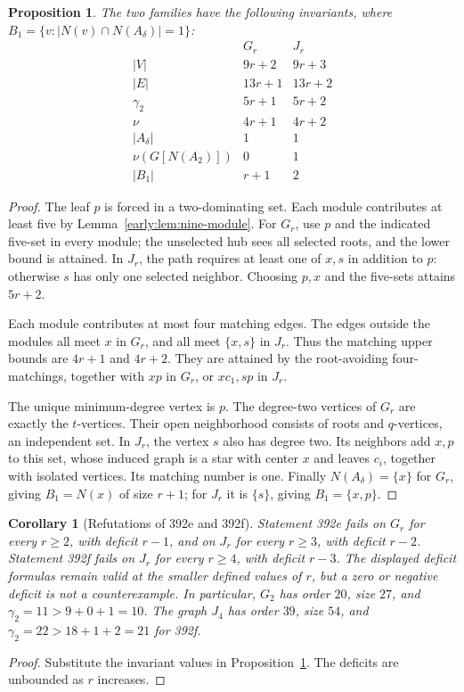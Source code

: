 \documentclass[11pt,a4paper]{article}
\newtheorem{proposition}[theorem]{Proposition}
\newtheorem{corollary}[theorem]{Corollary}
\theoremstyle{definition}\newtheorem{definition}[theorem]{Definition}
\theoremstyle{remark}\newtheorem{remark}[theorem]{Remark}
\begin{document}
\begin{proposition}
\label{early:prop:392-table}
The two families have the following invariants, where
$B_1=\{v:|N(v)\cap N(A_\delta)|=1\}$:
\[
\begin{array}{c|cc}
 &G_r&J_r\\\hline
 |V|&9r+2&9r+3\\
 |E|&13r+1&13r+2\\
 \gamma_2&5r+1&5r+2\\
 \nu&4r+1&4r+2\\
 |A_\delta|&1&1\\
 \nu(G[N(A_2)])&0&1\\
 |B_1|&r+1&2
\end{array}
\]
\end{proposition}
\begin{proof}
The leaf $p$ is forced in a two-dominating set.  Each module contributes
at least five by Lemma~\ref{early:lem:nine-module}.  For $G_r$, use $p$
and the indicated five-set in every module; the unselected hub sees all
selected roots, and the lower bound is attained.  In $J_r$, the path
requires at least one of $x,s$ in addition to $p$: otherwise $s$ has
only one selected neighbor.  Choosing $p,x$ and the five-sets attains
$5r+2$.

Each module contributes at most four matching edges.  The edges outside
the modules all meet $x$ in $G_r$, and all meet $\{x,s\}$ in $J_r$.
Thus the matching upper bounds are $4r+1$ and $4r+2$.  They are
attained by the root-avoiding four-matchings, together with $xp$ in
$G_r$, or $xc_1,sp$ in $J_r$.

The unique minimum-degree vertex is $p$.  The degree-two vertices of
$G_r$ are exactly the $t$-vertices.  Their open neighborhood consists
of roots and $q$-vertices, an independent set.  In $J_r$, the vertex
$s$ also has degree two.  Its neighbors add $x,p$ to this set, whose
induced graph is a star with center $x$ and leaves $c_i$, together
with isolated vertices.  Its matching number is one.  Finally
$N(A_\delta)=\{x\}$ for $G_r$, giving $B_1=N(x)$ of size $r+1$;
for $J_r$ it is $\{s\}$, giving $B_1=\{x,p\}$.
\end{proof}

\begin{corollary}[Refutations of 392e and 392f]
\label{early:cor:392ef}
Statement 392e fails on $G_r$ for every $r\geq2$, with deficit $r-1$,
and on $J_r$ for every $r\geq3$, with deficit $r-2$.
Statement 392f fails on $J_r$ for every $r\geq4$, with deficit $r-3$.
The displayed deficit formulas remain valid at the smaller defined values
of $r$, but a zero or negative deficit is not a counterexample.
In particular, $G_2$ has order $20$, size $27$, and
$\gamma_2=11>9+0+1=10$.  The graph $J_4$ has order $39$, size $54$,
and $\gamma_2=22>18+1+2=21$ for 392f.
\end{corollary}
\begin{proof}
Substitute the invariant values in Proposition~\ref{early:prop:392-table}.
The deficits are unbounded as $r$ increases.
\end{proof}
\end{document}
